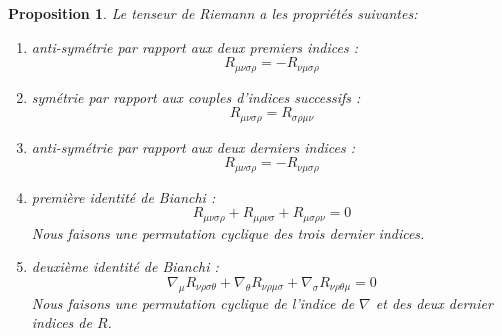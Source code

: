 \documentclass[a4paper,11pt]{report}
\theoremstyle{definition}
\theoremstyle{plain}
\newtheorem{prop}[thm]{Proposition}
\theoremstyle{definition}
\theoremstyle{remark}
\begin{document}
                \begin{prop}
                    Le tenseur de Riemann a les propriétés suivantes:
                    \begin{enumerate}[label = \textit{\roman*)}]
                        \item anti-symétrie par rapport aux deux premiers indices :
                        \begin{equation}
                            R_{\mu\nu\sigma\rho} = -R_{\nu\mu\sigma\rho}
                        \end{equation}
                        \item symétrie par rapport aux couples d'indices successifs :
                        \begin{equation}
                            R_{\mu\nu\sigma\rho} = R_{\sigma\rho\mu\nu}
                        \end{equation}
                        \item anti-symétrie par rapport aux deux derniers indices :
                        \begin{equation}
                            R_{\mu\nu\sigma\rho} = -R_{\nu\mu\sigma\rho}
                        \end{equation}
                        \item \textit{première identité de Bianchi} :
                        \begin{equation}
                        R_{\mu\nu\sigma\rho}+R_{\mu\rho\nu\sigma}+R_{\mu\sigma\rho\nu} = 0
                        \end{equation}
                        Nous faisons une permutation cyclique des trois dernier indices.
                        \item \textit{deuxième identité de Bianchi} :
                        \begin{equation}
                            \nabla_\mu R_{\nu\rho\sigma\theta} + \nabla_\theta R_{\nu\rho\mu\sigma}+\nabla_\sigma R_{\nu\rho\theta\mu} = 0
                        \end{equation}
                        Nous faisons une permutation cyclique de l'indice de $\nabla$ et des deux dernier indices de $R$.
                    \end{enumerate}
                \end{prop}
                
\end{document}
